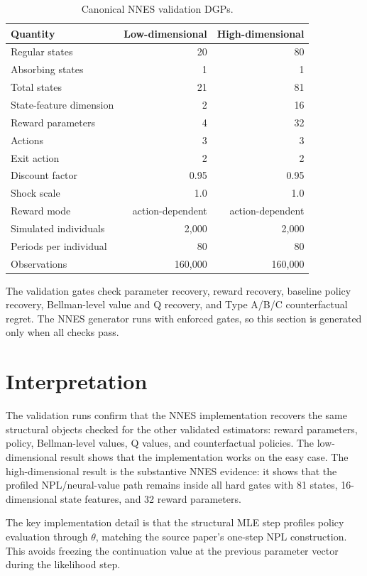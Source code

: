 \documentclass[10pt]{article}
\begin{document}
\begin{table}[H]
\centering\small
\caption{Canonical NNES validation DGPs.}
\begin{tabular}{lrr}
\toprule
Quantity & Low-dimensional & High-dimensional \\
\midrule
Regular states & 20 & 80 \\
Absorbing states & 1 & 1 \\
Total states & 21 & 81 \\
State-feature dimension & 2 & 16 \\
Reward parameters & 4 & 32 \\
Actions & 3 & 3 \\
Exit action & 2 & 2 \\
Discount factor & 0.95 & 0.95 \\
Shock scale & 1.0 & 1.0 \\
Reward mode & action-dependent & action-dependent \\
Simulated individuals & 2,000 & 2,000 \\
Periods per individual & 80 & 80 \\
Observations & 160,000 & 160,000 \\
\bottomrule
\end{tabular}
\end{table}

The validation gates check parameter recovery, reward recovery, baseline
policy recovery, Bellman-level value and Q recovery, and Type A/B/C
counterfactual regret. The NNES generator runs with enforced gates, so this
section is generated only when all checks pass.



\section{Interpretation}

The validation runs confirm that the NNES implementation recovers the same
structural objects checked for the other validated estimators: reward
parameters, policy, Bellman-level values, Q values, and counterfactual
policies. The low-dimensional result shows that the implementation works on the
easy case. The high-dimensional result is the substantive NNES evidence: it
shows that the profiled NPL/neural-value path remains inside all hard gates
with 81 states, 16-dimensional state features, and 32 reward parameters.

The key implementation detail is that the structural MLE step profiles policy
evaluation through \(\theta\), matching the source paper's one-step NPL
construction. This avoids freezing the continuation value at the previous
parameter vector during the likelihood step.
\end{document}
